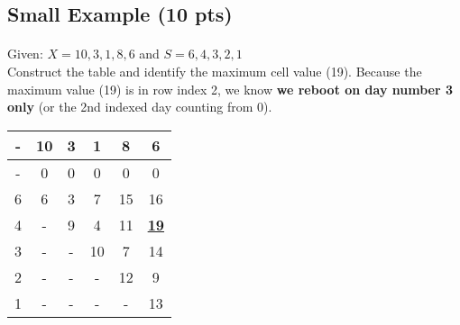 \documentclass[12pt]{article}
\begin{document}
\subsection{Small Example (10 pts)}
\begin{minipage}{0.6\linewidth}
\paragraph{}
\noindent Given: $X = {10, 3, 1, 8, 6}$ and $S = {6, 4, 3, 2, 1}$ \\
Construct the table and identify the maximum cell value (19).
Because the maximum value (19) is in row index 2, we know \textbf{we reboot on day number 3 only} (or the 2nd indexed day counting from 0).
\end{minipage}
\hspace{0.05\linewidth}
\begin{minipage}{0.3\linewidth}
\begin{tabular}{|c|c|c|c|c|c|}
\hline
- & 10 & 3 & 1 & 8 & 6 \\ \hline
- & 0 & 0 & 0 & 0 & 0 \\
6 & 6 & 3 & 7 & 15 & 16 \\
4 & - & 9 & 4 & 11 & \underline{\textbf{19}} \\
3 & - & - & 10 & 7 & 14 \\
2 & - & - & - & 12 & 9 \\
1 & - & - & - & - & 13 \\
\hline
\end{tabular}
\end{minipage}
\end{document}
